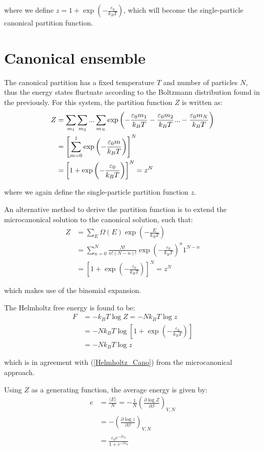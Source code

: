 \documentclass[book.tex]{subfiles}
\begin{document}
\noindent where we define $z = 1+\exp \left(-\frac{\varepsilon_0}{k_BT}\right)$, which will become the single-particle canonical partition function.

\section{Canonical ensemble}
The canonical partition has a fixed temperature $T$ and number of particles $N$, thus the energy states fluctuate according to the Boltzmann distribution found in the previously. For this system, the partition function $Z$ is written as:
\begin{align}
Z &= \sum_{m_1}\sum_{m_2}...\sum_{m_N} \exp \left(-\frac{\varepsilon_0 m_1}{k_BT}-\frac{\varepsilon_0 m_2}{k_BT} ... -\frac{\varepsilon_0 m_N}{k_BT}\right) \notag\\
&= \left[\sum_{m=0}^1\exp \left(-\frac{\varepsilon_0 m}{k_BT}\right)\right]^N \notag\\ 
&= \left[ 1+\exp \left(-\frac{\varepsilon_0}{k_BT}\right)\right]^N = z^N \notag
\end{align}

\noindent where we again define the single-particle partition function $z$.

An alternative method to derive the partition function is to extend the microcanonical solution to the canonical solution, such that:
\begin{align}
Z &= \sum_E \Omega (E) \exp \left(-\frac{E}{k_BT}\right) \\ 
&= \sum_{n=0}^N \frac{N!}{n!(N-n)!}\exp \left(-\frac{\varepsilon_0}{k_BT}\right)^n 1^{N-n} \\
&= \left[ 1 + \exp \left( -\frac{\varepsilon_0}{k_BT} \right)\right]^N = z^N 
\end{align}

\noindent which makes use of the binomial expansion.

The Helmholtz free energy is found to be:
\begin{align}
F &= -k_BT\log Z = -Nk_BT \log z \\ 
&= -N k_B T \log \left[ 1+ \exp \left(-\frac{\varepsilon_0}{k_BT}\right)\right] \\
&= -Nk_BT \log z 
\end{align}

\noindent which is in agreement with (\ref{Helmholtz_Cano}) from the microcanonical approach.

Using $Z$ as a generating function, the average energy is given by:
\begin{align}
e &= \frac{\langle E \rangle}{N} =-\frac{1}{N} \left(\frac{\partial \log Z}{\partial \beta}\right)_{V,N} \\ 
&= - \left(\frac{\partial \log z}{\partial \beta}\right)_{V,N} \\
&= \frac{\varepsilon_0 e^{-\beta \varepsilon_0}}{1+e^{-\beta \varepsilon_0}} 
\end{align}
\end{document}
